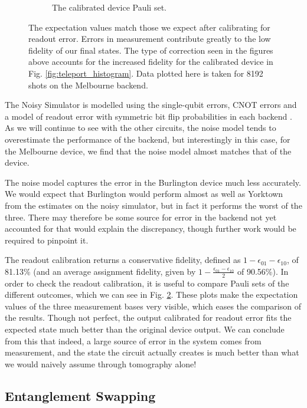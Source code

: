 \begin{figure}[h!]
\begin{subfigure}{.5\textwidth}
    \caption{The calibrated device Pauli set.}
    \label{fig:tele_pauli_dev}
  \end{subfigure}
  \caption{The expectation values match those we expect after calibrating for
readout error. Errors in measurement contribute greatly to the low fidelity of
our final states. The type of correction seen in the figures above accounts for
the increased fidelity for the calibrated device in Fig.
\ref{fig:teleport_histogram}. Data plotted here is taken for 8192 shots on the
Melbourne backend.}
  \label{fig:tele_paulis}
\end{figure}

The Noisy Simulator is modelled using the single-qubit
errors, CNOT errors and a model of readout error with symmetric bit flip
probabilities in each backend \cite{qiskit_org}. As we will continue to see with
the other circuits, the noise model tends to overestimate the performance of
the backend, but interestingly in this case, for the Melbourne device, we find
that the noise model almost matches that of the device.

The noise model captures the error in the Burlington device much less
accurately. We would expect that Burlington would perform almost as well as
Yorktown from the estimates on the noisy simulator, but in fact it performs the
worst of the three. There may therefore be some source for error in the backend
not yet accounted for that would explain the discrepancy, though further work
would be required to pinpoint it.

The readout calibration returns a conservative fidelity, defined as
$1-\epsilon_{01}-\epsilon_{10}$, of 81.13\% (and an average assignment fidelity,
given by $1-\frac{\epsilon_{01}-\epsilon_{10}}{2}$ of 90.56\%). In order to
check the readout calibration, it is useful to compare Pauli sets of the
different outcomes, which we can see in Fig. \ref{fig:tele_paulis}. These plots
make the expectation values of the three measurement bases very visible, which
eases the comparison of the results. Though not perfect, the output calibrated
for readout error fits the expected state much better than the original device
output. We can conclude from this that indeed, a large source of error in the
system comes from measurement, and the state the circuit actually creates is
much better than what we would naively assume through tomography alone!

\subsection{Entanglement Swapping}

